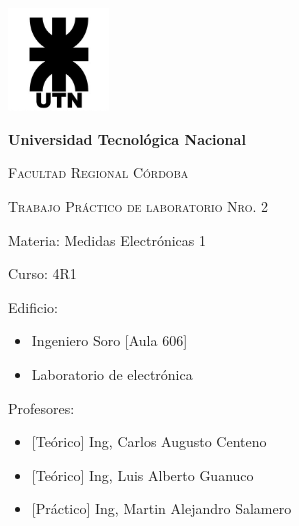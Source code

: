 \documentclass[12pt, letterpaper]{article}
\begin{document}
    \begin{titlepage}
        \centering %
        {\includegraphics[width=0.2\textwidth]{imagenes/UTN_logo.jpg}\par}
        {\bfseries\LARGE Universidad Tecnológica Nacional \par}
        {\scshape\Large Facultad Regional Córdoba\par}
        \vspace{0.5cm}
        {\scshape\Huge Trabajo Práctico de laboratorio Nro. 2  \par}%
        \raggedright %
        \vspace{0.5cm}
        {\Large Materia: Medidas Electrónicas 1 \par}%
        \vspace{0.5cm}
        {\Large Curso: 4R1 \par}
        \vspace{0.5cm}
        {\Large Edificio: \par}%
            \begin{itemize}
                \item{\Large Ingeniero Soro [Aula 606] \par}
                \item{\Large Laboratorio de electrónica \par}
            \end{itemize}
        \vspace{0.5cm}
        {\Large Profesores: \par} %
            \begin{itemize}
                \item{\Large [Teórico] Ing, Carlos Augusto Centeno \par}
                \item{\Large [Teórico] Ing, Luis Alberto Guanuco \par}
                \item{\Large [Práctico] Ing, Martin Alejandro Salamero \par}
            \end{itemize}
        \vspace{0.5cm}

\end{titlepage}
\end{document}
